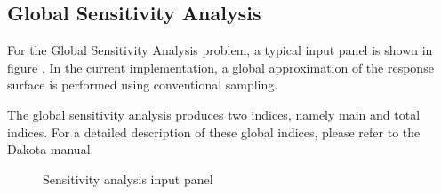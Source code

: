 \subsection{Global Sensitivity Analysis}

For the Global Sensitivity Analysis problem, a typical input panel is shown in figure . In the current implementation, a global approximation of the response surface is performed using conventional sampling. 

The global sensitivity analysis produces two indices, namely main and total indices. For a detailed description of these global indices, please refer to the Dakota manual. 

\begin{figure}[!htbp]
  \caption{Sensitivity analysis input panel}
  \label{fig:sens}
\end{figure}

